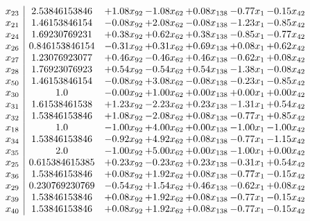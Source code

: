 \documentclass[8pt]{article}
\begin{document}
\[\begin{array}{c| c c@{\hskip 2pt} c@{\hskip 2pt} c@{\hskip 2pt} c@{\hskip 2pt} c@{\hskip 2pt} }
 x_{23}   &  2.53846153846 & +  1.08 x_{92} & -1.08 x_{62} & +  0.08 x_{138} & -0.77 x_{1} & -0.15 x_{42}\\
 x_{21}   &  1.46153846154 & -0.08 x_{92} & +  2.08 x_{62} & -0.08 x_{138} & -1.23 x_{1} & -0.85 x_{42}\\
 x_{24}   &  1.69230769231 & +  0.38 x_{92} & +  0.62 x_{62} & +  0.38 x_{138} & -0.85 x_{1} & -0.77 x_{42}\\
 x_{26}   &  0.846153846154 & -0.31 x_{92} & +  0.31 x_{62} & +  0.69 x_{138} & +  0.08 x_{1} & +  0.62 x_{42}\\
 x_{27}   &  1.23076923077 & +  0.46 x_{92} & -0.46 x_{62} & +  0.46 x_{138} & -0.62 x_{1} & +  0.08 x_{42}\\
 x_{28}   &  1.76923076923 & +  0.54 x_{92} & -0.54 x_{62} & +  0.54 x_{138} & -1.38 x_{1} & -0.08 x_{42}\\
 x_{50}   &  1.46153846154 & -0.08 x_{92} & +  3.08 x_{62} & -0.08 x_{138} & -0.23 x_{1} & -0.85 x_{42}\\
 x_{30}   &  1.0 & -0.00 x_{92} & +  1.00 x_{62} & +  0.00 x_{138} & +  0.00 x_{1} & +  0.00 x_{42}\\
 x_{31}   &  1.61538461538 & +  1.23 x_{92} & -2.23 x_{62} & +  0.23 x_{138} & -1.31 x_{1} & +  0.54 x_{42}\\
 x_{32}   &  1.53846153846 & +  1.08 x_{92} & -2.08 x_{62} & +  0.08 x_{138} & -0.77 x_{1} & +  0.85 x_{42}\\
 x_{18}   &  1.0 & -1.00 x_{92} & +  4.00 x_{62} & +  0.00 x_{138} & -1.00 x_{1} & -1.00 x_{42}\\
 x_{34}   &  1.53846153846 & -0.92 x_{92} & +  4.92 x_{62} & +  0.08 x_{138} & -0.77 x_{1} & -1.15 x_{42}\\
 x_{35}   &  2.0 & -1.00 x_{92} & +  5.00 x_{62} & +  0.00 x_{138} & -1.00 x_{1} & +  0.00 x_{42}\\
 x_{25}   &  0.615384615385 & +  0.23 x_{92} & -0.23 x_{62} & +  0.23 x_{138} & -0.31 x_{1} & +  0.54 x_{42}\\
 x_{36}   &  1.53846153846 & +  0.08 x_{92} & +  1.92 x_{62} & +  0.08 x_{138} & -0.77 x_{1} & -0.15 x_{42}\\
 x_{29}   &  0.230769230769 & -0.54 x_{92} & +  1.54 x_{62} & +  0.46 x_{138} & -0.62 x_{1} & +  0.08 x_{42}\\
 x_{39}   &  1.53846153846 & +  0.08 x_{92} & +  1.92 x_{62} & +  0.08 x_{138} & -0.77 x_{1} & -0.15 x_{42}\\
 x_{40}   &  1.53846153846 & +  0.08 x_{92} & +  1.92 x_{62} & +  0.08 x_{138} & -0.77 x_{1} & -0.15 x_{42}\\

\end{array}\]
\end{document}
